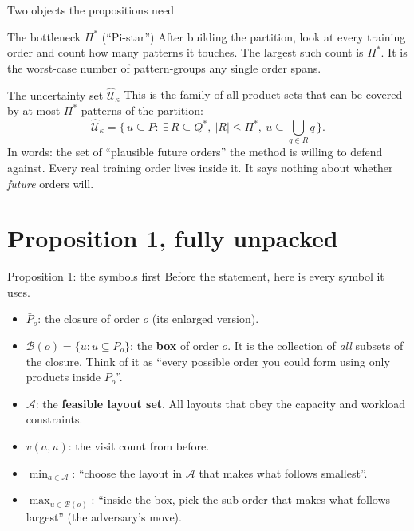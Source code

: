 \documentclass[11pt,aspectratio=169]{beamer}
\newcommand{\term}[1]{\textcolor{blue!60!black}{\textbf{#1}}}
\begin{document}
\begin{frame}{Two objects the propositions need}
  \begin{block}{The bottleneck $\Pi^*$ (``Pi-star'')}
  After building the partition, look at every training order and count how many patterns it touches. The largest such count is $\Pi^*$. It is the worst-case number of pattern-groups any single order spans.
  \end{block}
  \begin{block}{The uncertainty set $\widehat{\mathcal U}_\kappa$}
  This is the family of all product sets that can be covered by at most $\Pi^*$ patterns of the partition:
  \[
  \widehat{\mathcal U}_\kappa = \Big\{\, u \subseteq P :\ \exists\, R\subseteq Q^*,\ |R|\le \Pi^*,\ u \subseteq \textstyle\bigcup_{q\in R} q \,\Big\}.
  \]
  In words: the set of ``plausible future orders'' the method is willing to defend against. Every real training order lives inside it. It says nothing about whether \emph{future} orders will.
  \end{block}
\end{frame}

\section{Proposition 1, fully unpacked}

\begin{frame}{Proposition 1: the symbols first}
  Before the statement, here is every symbol it uses.
  \begin{itemize}
    \item $\bar P_o$: the closure of order $o$ (its enlarged version).
    \item $\mathcal B(o) = \{u : u \subseteq \bar P_o\}$: the \term{box} of order $o$. It is the collection of \emph{all} subsets of the closure. Think of it as ``every possible order you could form using only products inside $\bar P_o$''.
    \item $\mathcal A$: the \term{feasible layout set}. All layouts that obey the capacity and workload constraints.
    \item $v(a,u)$: the visit count from before.
    \item $\min_{a\in\mathcal A}$: ``choose the layout in $\mathcal A$ that makes what follows smallest''.
    \item $\max_{u\in\mathcal B(o)}$: ``inside the box, pick the sub-order that makes what follows largest'' (the adversary's move).
  \end{itemize}
\end{frame}
\end{document}
